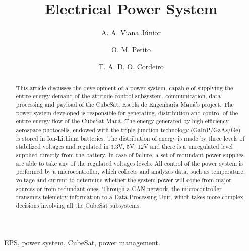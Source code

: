 \documentclass[3p]{elsarticle}
\begin{document}
\begin{frontmatter}

\title{Electrical Power System}


\author[label1,label5]{A. A. Viana J\'{u}nior}
\address[label1]{Pra\c{c}a Mau\'{a}, 1, S\~{a}o Caetano do Sul, S\~{a}o Paulo, Brasil}




\author[label1,label5]{O. M. Petito}
\address[label5]{Escola de Engenharia Mau\'{a}}

\author[label1,label5]{T. A. D. O. Cordeiro}

\begin{abstract}

	This article discusses the development of a power system, capable of supplying the entire energy demand of the attitude control subsystem, communication, data processing and payload of the CubeSat, Escola de Engenharia Mau\'{a}'s project. The power system developed is responsible for generating, distribution and control of the entire energy flow of the CubeSat Mau\'{a}. The energy generated by high efficiency aerospace photocells, endowed with the triple junction technology (GaInP/GaAs/Ge) is stored in Ion-Lithium batteries. The distribution of energy is made by three levels of stabilized voltages and regulated in 3.3V, 5V, 12V and there is a unregulated level supplied directly from the battery. In case of failure, a set of redundant power supplies are able to take any of the regulated voltages levels. All control of the power system is performed by a microcontroller, which collects and analyzes data, such as temperature, voltage and current to determine whether the system power will come from major sources or from redundant ones. Through a CAN network, the microcontroller transmits telemetry information to a Data Processing Unit, which takes more complex decisions involving all the CubeSat subsystems.

\end{abstract}

\begin{keyword}
 
	EPS, power system, CubeSat, power management.

\end{keyword}

\end{frontmatter}
\end{document}

